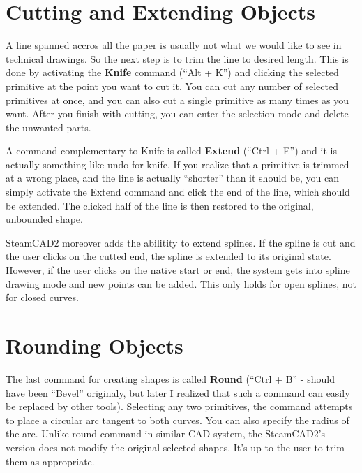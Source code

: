 \section{Cutting and Extending Objects}\label{sec:extend}

A line spanned accros all the paper is usually not what we would like to see in technical
drawings. So the next step is to trim the line to desired length. This is done by
activating the \textbf{Knife} command (``Alt + K'') and clicking the selected primitive at the
point you want to cut it. You can cut any number of selected primitives at once,
and you can also cut a single primitive as many times as you want. After you finish
with cutting, you can enter the selection mode and delete the unwanted parts.

A command complementary to Knife is called \textbf{Extend} (``Ctrl + E'') and it is
actually something like undo for knife. If you realize that a primitive is trimmed
at a wrong place, and the line is actually ``shorter'' than it should be, you can simply
activate the Extend command and click the end of the line, which should be extended.
The clicked half of the line is then restored to the original, unbounded shape.

SteamCAD2 moreover adds the abilitity to extend splines. If the spline is cut and the
user clicks on the cutted end, the spline is extended to its original state. However,
if the user clicks on the native start or end, the system gets into spline drawing mode
and new points can be added. This only holds for open splines, not for closed curves.

\section{Rounding Objects}

The last command for creating shapes is called \textbf{Round} (``Ctrl + B'' - should have
been ``Bevel'' originaly, but later I realized that such a command can easily be replaced
by other tools). Selecting any two primitives, the command attempts to place a circular
arc tangent to both curves. You can also specify the radius of the arc. Unlike round
command in similar CAD system, the SteamCAD2's version does not modify the original
selected shapes. It's up to the user to trim them as appropriate.

